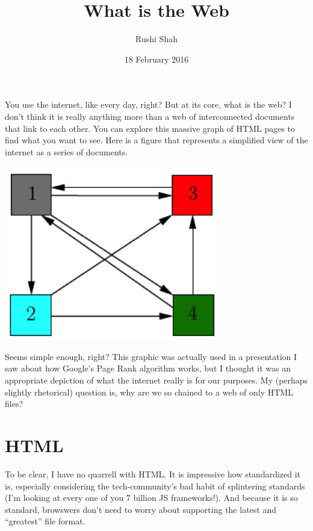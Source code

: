 \documentclass[12pt]{article}
\title{What is the Web}
\author{Rushi Shah}
\date{18 February 2016}
\begin{document}
  \maketitle


  You use the internet, like every day, right? But at its core, what is the web? I don't think it is really anything more than a web of interconnected documents that link to each other. You can explore this massive graph of HTML pages to find what you want to see. Here is a figure that represents a simplified view of the internet as a series of documents. 

  \begin{center}
  \includegraphics[height=3in]{documents}
  \end{center}

  Seems simple enough, right? This graphic was actually used in a presentation I saw about how Google's Page Rank algorithm works, but I thought it was an appropriate depiction of what the internet really is for our purposes. My (perhaps slightly rhetorical) question is, why are we so chained to a web of only HTML files?

  \section{HTML}

  To be clear, I have no quarrell with HTML. It is impressive how standardized it is, especially considering the tech-community's bad habit of splintering standards (I'm looking at every one of you 7 billion JS frameworks!). And because it is so standard, browswers don't need to worry about supporting the latest and ``greatest'' file format.
\end{document}
